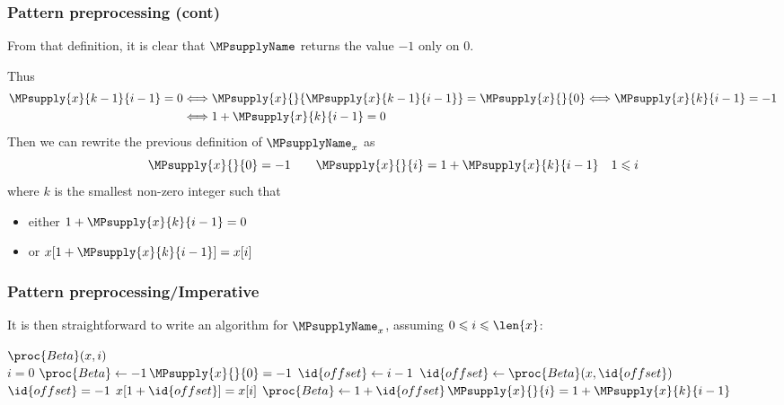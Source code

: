 %
\begin{frame}
\frametitle{Pattern preprocessing (cont)}

\label{beta_def}

From that definition, it is clear that \(\MPsupplyName\) returns the value
\(-1\) only on \(0\). 

\bigskip

Thus
\begin{align*}
  \MPsupply{x}{k-1}{i-1} = 0
&\Longleftrightarrow
  \MPsupply{x}{}{\MPsupply{x}{k-1}{i-1}} = \MPsupply{x}{}{0}
\Longleftrightarrow
  \MPsupply{x}{k}{i-1} = -1\\
&\Longleftrightarrow
  1 + \MPsupply{x}{k}{i-1} = 0
\end{align*}
Then we can rewrite the previous definition of \(\MPsupplyName_{x}\) as
\[
\MPsupply{x}{}{0} = -1 \qquad \MPsupply{x}{}{i} = 1 + \MPsupply{x}{k}{i-1}
\quad 1 \leqslant i
\]
where \(k\) is the smallest non-zero integer such that
\begin{itemize}

  \item either \(1 + \MPsupply{x}{k}{i-1} = 0\)

  \item or \(x[1+\MPsupply{x}{k}{i-1}] = x[i]\)

\end{itemize}

\end{frame}

%
\begin{frame}
\frametitle{Pattern preprocessing/Imperative}

It is then straightforward to write an algorithm for \(\MPsupplyName_{x}\),
assuming \(0 \leqslant i \leqslant \len{x}\):
\begin{codebox}
\(\proc{Beta} (x, i)\)\\
\li \If \(i = 0\)
\li \Then \(\proc{Beta} \gets -1\)\RComment \(\MPsupply{x}{}{0} = -1\)
\li \Else \(\id{offset} \gets i-1\) 
\li       \Repeat
\li         \(\id{offset} \gets \proc{Beta}(x,\id{offset})\)
\li       \Until \(\id{offset} = -1\) \LogOr \(x[1+\id{offset}] = x[i]\)
\li       \(\proc{Beta} \gets 1 + \id{offset}\)\RComment \(\MPsupply{x}{}{i}
= 1+\MPsupply{x}{k}{i-1}\)
    \End
\end{codebox}

\end{frame}

